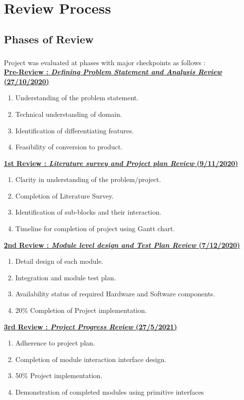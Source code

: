 \appendix
\chapter{Review Process}
\section{Phases of Review}
\paragraph{} Project was evaluated at phases with major checkpoints as follows :\\

\textbf {\underline{Pre-Review :  \textit{Defining Problem Statement and Analysis Review} (27/10/2020)}}
\begin{enumerate}
\item Understanding of the problem statement.  
\item Technical understanding of domain. 
\item Identification of differentiating features.
\item Feasibility of conversion to product.
\end{enumerate}

\textbf {\underline{1st Review :  \textit{Literature survey and Project plan Review } (9/11/2020)}}
\begin{enumerate}
\item Clarity in understanding of the problem/project. 
\item Completion of Literature Survey. 
\item Identification of sub-blocks and their interaction.
\item Timeline for completion of project using Gantt chart.
\end{enumerate}

\textbf {\underline{2nd Review :  \textit{Module level design and Test Plan Review} (7/12/2020)}}
\begin{enumerate}
\item Detail design of each module. 
\item Integration and module test plan. 
\item Availability status of required Hardware and Software components.
\item 20\% Completion of Project implementation.
\end{enumerate}
\newpage
    
\textbf {\underline{3rd Review :  \textit{Project Progress Review} (27/5/2021)}}
\begin{enumerate}
\item Adherence to project plan.
\item Completion of module interaction interface design.
\item 50\% Project implementation.
\item Demonstration of completed modules using primitive interfaces 
\end{enumerate}


